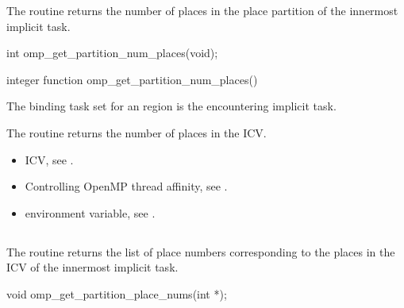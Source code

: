 \summary
The  routine returns the number 
of places in the place partition of the innermost implicit task.

\format
\begin{ccppspecific}
\begin{ompcFunction}
int omp_get_partition_num_places(void);
\end{ompcFunction}
\end{ccppspecific}

\begin{fortranspecific}
\begin{ompfFunction}
integer function omp_get_partition_num_places()
\end{ompfFunction}
\end{fortranspecific}

\binding
The binding task set for an   
region is the encountering implicit task.

\effect
The  routine returns the number 
of places in the  ICV.

\crossreferences
\begin{itemize}
\item {} ICV, see
.

\item Controlling OpenMP thread affinity, see
.

\item {} environment variable, see
.
\end{itemize}



\subsection{}
\label{subsec:omp_get_partition_place_nums}

\summary
The  routine returns the list of 
place numbers corresponding to the places in the  
ICV of the innermost implicit task.

\format
\begin{ccppspecific}
\begin{ompcFunction}
void omp_get_partition_place_nums(int *);
\end{ompcFunction}
\end{ccppspecific}

